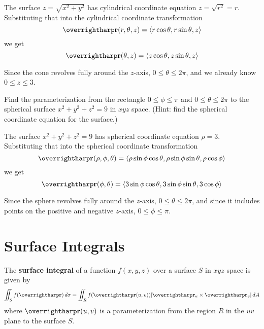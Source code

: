 \documentclass[letterpaper, twoside, 12pt]{book}
\begin{document}
          \begin{solution}
            The surface $z=\sqrt{x^2+y^2}$ has cylindrical coordinate
            equation $z=\sqrt{r^2}=r$.
            Substituting that into the cylindrical coordinate transformation
            \[
              \vect{r}(r,\theta,z)
                =
              \<r\cos\theta,r\sin\theta,z\>
            \]
            we get
            \[
              \vect{r}(\theta,z)
                =
              \<z\cos\theta,z\sin\theta,z\>
            \]

            Since the cone revolves fully around the $z$-axis,
            $0\leq\theta\leq2\pi$, and we already know $0\leq z\leq 3$.
          \end{solution}

          \begin{problem}
            Find the parameterization from the rectangle $0\leq\phi\leq\pi$
            and $0\leq\theta\leq2\pi$ to the spherical surface
            $x^2+y^2+z^2=9$ in $xyz$ space. (Hint: find the spherical
            coordinate equation for the surface.)
          \end{problem}

          \begin{solution}
            The surface $x^2+y^2+z^2=9$ has spherical coordinate
            equation $\rho=3$.
            Substituting that into the spherical coordinate transformation
            \[
              \vect{r}(\rho,\phi,\theta)
                =
              \<\rho\sin\phi\cos\theta, \rho\sin\phi\sin\theta, \rho\cos\phi\>
            \]
            we get
            \[
              \vect{r}(\phi,\theta)
                =
              \<3\sin\phi\cos\theta, 3\sin\phi\sin\theta, 3\cos\phi\>
            \]

            Since the sphere revolves fully around the $z$-axis,
            $0\leq\theta\leq2\pi$, and since it includes points on the positive
            and negative $z$-axis, $0\leq\phi\leq\pi$.
          \end{solution}


\section{Surface Integrals} %

\begin{definition}
  The \textbf{surface integral} of a function $f(x,y,z)$ over a surface
  $S$ in $xyz$ space is given by
  \[
    \iint_S f(\vect{r})\dvar{\sigma}
      =
    \iint_R f(\vect{r}(u,v))|\vect{r}_u\times\vect{r}_v|\dvar{A}
  \]
  where $\vect{r}(u,v)$ is a parameterization from the region $R$ in
  the $uv$ plane to the surface $S$.
\end{definition}
\end{document}

